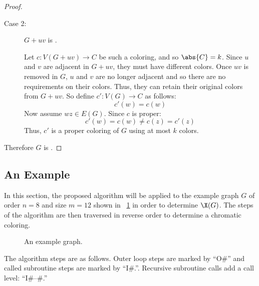 \begin{proof}
\begin{description}
  \item [Case 2:] \(G+uv\) is .

    Let \(c:V(G+uv)\to C\) be such a coloring, and so \(\abs{C}=k\).  Since \(u\) and \(v\) are adjacent in
    \(G+uv\), they must have different colors.  Once \(uv\) is removed in \(G\), \(u\) and \(v\) are no longer
    adjacent and so there are no requirements on their colors.  Thus, they can retain their original colors from
    \(G+uv\).  So define \(c':V(G)\to C\) as follows:
    \[c'(w)=c(w)\]
    Now assume \(wz\in E(G)\).  Since \(c\) is proper:
    \[c'(w)=c(w)\ne c(z)=c'(z)\]
    Thus, \(c'\) is a proper coloring of \(G\) using at most \(k\) colors.
  \end{description}

  Therefore \(G\) is .
\end{proof}

\subsection{An Example}\label{sec:sub:example}

In this section, the proposed algorithm will be applied to the example graph \(G\) of order \(n=8\) and size
\(m=12\) shown in \figurename~\ref{fig:example} in order to determine \(\X(G)\).  The steps of the algorithm are
then traversed in reverse order to determine a chromatic coloring.

\begin{figure}[H]
  \centering
  \caption{An example graph.}
  \label{fig:example}
\end{figure}

The algorithm steps are as follows.  Outer loop steps are marked by ``O\#'' and called subroutine steps are marked by
``I\#.''.  Recursive subroutine calls add a call level: ``I\#--\#.''

